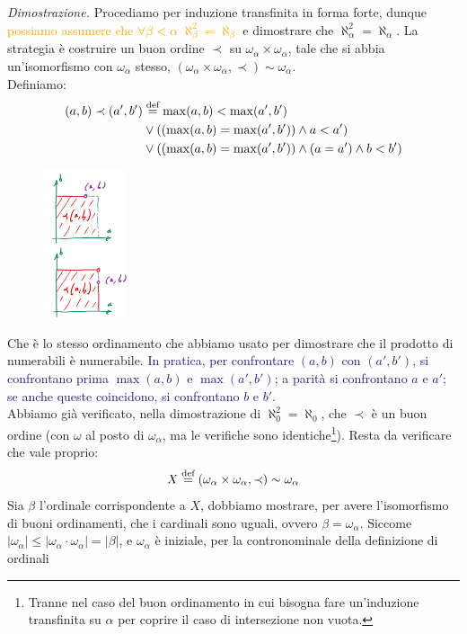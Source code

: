 \hspace{-0.41cm}\emph{Dimostrazione.}\quad
	Procediamo per induzione transfinita in forma forte, dunque \textcolor{orange}{possiamo assumere che $\forall \beta < \alpha \; \aleph_\beta^2 = \aleph_\beta$} e dimostrare che $\aleph_\alpha^2 = \aleph_\alpha$. La strategia è costruire un buon ordine $\prec$ su $\omega_\alpha \times \omega_\alpha$,
	tale che si abbia un'isomorfismo con $\omega_\alpha$ stesso, $(\omega_\alpha \times \omega_\alpha, \prec) \sim \omega_\alpha$.\\
	Definiamo:
	\begin{align*}
		(a,b) \prec (a',b') &\overset{\text{def}}{=} \max(a,b) < \max(a',b') \\
							&\lor ((\max(a,b) = \max(a',b')) \land a < a') \\
							&\lor ((\max(a,b) = \max(a',b')) \land (a = a') \land b < b')
	\end{align*}
	\begin{figure}
		\vspace{-1cm}
		\includegraphics[width=2.5cm]{immagini/ordine_omega.png}
	\end{figure}
	Che è lo stesso ordinamento che abbiamo usato per dimostrare che il prodotto di numerabili è numerabile.
	\textcolor{MidnightBlue}{In pratica, per confrontare $(a,b)$ con $(a',b')$, si confrontano prima $\max(a,b)$ e $\max(a',b')$;
	a parità si confrontano $a$ e $a'$; se anche queste coincidono, si confrontano $b$ e $b'$.}\\
	Abbiamo già verificato, nella dimostrazione di $\aleph_0^2 = \aleph_0$, che $\prec$ è un buon ordine (con $\omega$ al posto di $\omega_\alpha$, ma le verifiche sono identiche\footnote{Tranne nel caso del buon ordinamento in cui bisogna fare un'induzione transfinita su $\alpha$ per coprire il caso di intersezione non vuota.}).
	Resta da verificare che vale proprio:
	\[ X \overset{\text{def}}{=} (\omega_\alpha \times \omega_\alpha, \prec) \sim \omega_\alpha
		\]
	Sia $\beta$ l'ordinale corrispondente a $X$, dobbiamo mostrare, per avere l'isomorfismo di buoni ordinamenti, che i cardinali sono uguali, ovvero $\beta = \omega_\alpha$. Siccome $|\omega_\alpha| \leq |\omega_\alpha \cdot \omega_\alpha| = |\beta|$, e $\omega_\alpha$ è iniziale, per la contronominale della definizione di ordinali
